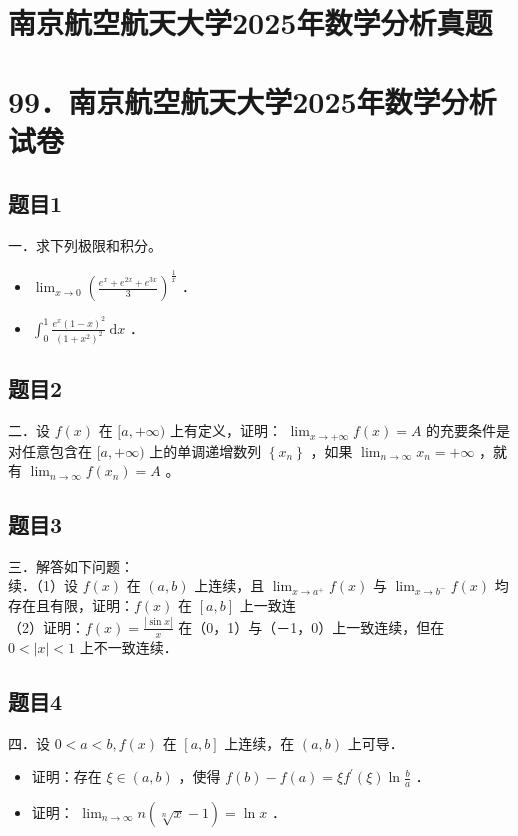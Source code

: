 \documentclass{article}
\begin{document}
\section*{南京航空航天大学2025年数学分析真题}
\section*{99．南京航空航天大学2025年数学分析试卷}

\subsection{题目1}
一．求下列极限和积分。

\begin{itemize}
  \item[（1）] \(\lim _{x \rightarrow 0}\left(\frac{e^{x}+e^{2 x}+e^{3 x}}{3}\right)^{\frac{1}{x}}\) ．
  \item[（2）] \(\int_{0}^{1} \frac{e^{x}(1-x)^{2}}{\left(1+x^{2}\right)^{2}} \mathrm{~d} x\) ．
\end{itemize}

\subsection{题目2}
二．设 \(f(x)\) 在 \([a,+\infty)\) 上有定义，证明： \(\lim _{x \rightarrow+\infty} f(x)=A\) 的充要条件是对任意包含在 \([a,+\infty)\) 上的单调递增数列 \(\left\{x_{n}\right\}\) ，如果 \(\lim _{n \rightarrow \infty} x_{n}=+\infty\) ，就有 \(\lim _{n \rightarrow \infty} f\left(x_{n}\right)=A\) 。

\subsection{题目3}
三．解答如下问题：\\
续．（1）设 \(f(x)\) 在 \((a, b)\) 上连续，且 \(\lim _{x \rightarrow a^{+}} f(x)\) 与 \(\lim _{x \rightarrow b^{-}} f(x)\) 均存在且有限，证明：\(f(x)\) 在 \([a, b]\) 上一致连\\
（2）证明：\(f(x)=\frac{|\sin x|}{x}\) 在（0，1）与（－1，0）上一致连续，但在 \(0<|x|<1\) 上不一致连续．

\subsection{题目4}
四．设 \(0<a<b, f(x)\) 在 \([a, b]\) 上连续，在 \((a, b)\) 上可导．

\begin{itemize}
  \item[（1）] 证明：存在 \(\xi \in(a, b)\) ，使得 \(f(b)-f(a)=\xi f^{\prime}(\xi) \ln \frac{b}{a}\) ．
  \item[（2）] 证明： \(\lim _{n \rightarrow \infty} n(\sqrt[n]{x}-1)=\ln x\) ．
\end{itemize}
\end{document}
